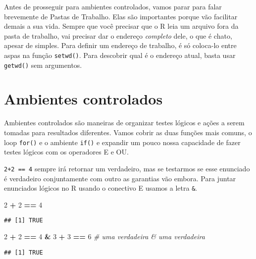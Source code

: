 \documentclass[]{article}
\newenvironment{Shaded}{\begin{snugshade}}{\end{snugshade}}
\newcommand{\CommentTok}[1]{\textcolor[rgb]{0.56,0.35,0.01}{\textit{#1}}}
\newcommand{\DecValTok}[1]{\textcolor[rgb]{0.00,0.00,0.81}{#1}}
\newcommand{\OperatorTok}[1]{\textcolor[rgb]{0.81,0.36,0.00}{\textbf{#1}}}
\newcommand{\StringTok}[1]{\textcolor[rgb]{0.31,0.60,0.02}{#1}}
\begin{document}
Antes de prosseguir para ambientes controlados, vamos parar para falar
brevemente de Pastas de Trabalho. Elas são importantes porque vão
facilitar demais a sua vida. Sempre que você precisar que o R leia um
arquivo fora da pasta de trabalho, vai precisar dar o endereço
\emph{completo} dele, o que é chato, apesar de simples. Para definir um
endereço de trabalho, é só coloca-lo entre aspas na função
\texttt{setwd()}. Para descobrir qual é o endereço atual, basta usar
\texttt{getwd()} sem argumentos.

\hypertarget{ambientes-controlados}{%
\section{Ambientes controlados}\label{ambientes-controlados}}

Ambientes controlados são maneiras de organizar testes lógicos e ações a
serem tomadas para resultados diferentes. Vamos cobrir as duas funções
mais comuns, o loop \texttt{for()} e o ambiente \texttt{if()} e expandir
um pouco nossa capacidade de fazer testes lógicos com os operadores E e
OU.

\texttt{2+2\ ==\ 4} sempre irá retornar um verdadeiro, mas se testarmos
se esse enunciado é verdadeiro conjuntamente com outro as garantias vão
embora. Para juntar enunciados lógicos no R usando o conectivo E usamos
a letra \texttt{\&}.

\begin{Shaded}
\begin{Highlighting}[]
\DecValTok{2} \OperatorTok{+}\StringTok{ }\DecValTok{2} \OperatorTok{==}\StringTok{ }\DecValTok{4}
\end{Highlighting}
\end{Shaded}

\begin{verbatim}
## [1] TRUE
\end{verbatim}

\begin{Shaded}
\begin{Highlighting}[]
\DecValTok{2} \OperatorTok{+}\StringTok{ }\DecValTok{2} \OperatorTok{==}\StringTok{ }\DecValTok{4} \OperatorTok{&}\StringTok{ }\DecValTok{3} \OperatorTok{+}\StringTok{ }\DecValTok{3} \OperatorTok{==}\StringTok{ }\DecValTok{6} \CommentTok{# uma verdadeira & uma verdadeira}
\end{Highlighting}
\end{Shaded}

\begin{verbatim}
## [1] TRUE
\end{verbatim}
\end{document}
